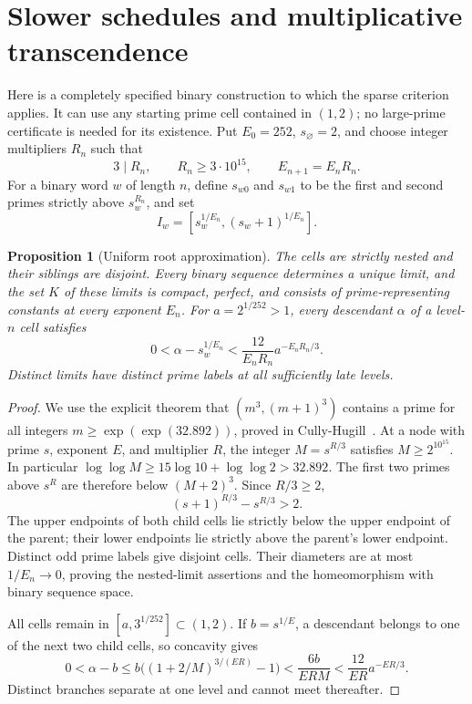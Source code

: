 \documentclass[11pt,a4paper]{article}
\newtheorem{proposition}[theorem]{Proposition}
\theoremstyle{definition}
\theoremstyle{remark}
\numberwithin{equation}{section}
\begin{document}
\section{Slower schedules and multiplicative transcendence}
\label{fol:sec:slower-schedules}

Here is a completely specified binary construction to which the sparse
criterion applies. It can use any starting prime cell contained in
$(1,2)$; no large-prime certificate is needed for its existence.
Put $E_0=252$, $s_{\varnothing}=2$, and choose integer multipliers $R_n$
such that
\begin{equation}\label{fol:eq:explicit-R-range}
 3\mid R_n,\qquad R_n\ge3\cdot10^{15},\qquad E_{n+1}=E_nR_n.
\end{equation}
For a binary word $w$ of length $n$, define $s_{w0}$ and $s_{w1}$ to
be the first and second primes strictly above $s_w^{R_n}$, and set
\[
 I_w=[s_w^{1/E_n},(s_w+1)^{1/E_n}].
\]

\begin{proposition}[Uniform root approximation]
\label{fol:prop:slow-tree}
The cells are strictly nested and their siblings are disjoint. Every
binary sequence determines a unique limit, and the set $K$ of these
limits is compact, perfect, and consists of prime-representing constants
at every exponent $E_n$. For
$a=2^{1/252}>1$, every descendant $\alpha$ of a level-$n$ cell satisfies
\begin{equation}\label{fol:eq:slow-error}
 0<\alpha-s_w^{1/E_n}
 <\frac{12}{E_nR_n}a^{-E_nR_n/3}.
\end{equation}
Distinct limits have distinct prime labels at all sufficiently late
levels.
\end{proposition}

\begin{proof}
We use the explicit theorem that $(m^3,(m+1)^3)$ contains a prime for
all integers $m\ge\exp(\exp(32.892))$, proved in
Cully-Hugill~\cite[Section~4]{CullyHugill2023}. At a node with prime
$s$, exponent $E$, and multiplier $R$, the integer $M=s^{R/3}$ satisfies
$M\ge2^{10^{15}}$. In particular
$\log\log M\ge15\log10+\log\log2>32.892$.
The first two primes above $s^R$ are therefore below $(M+2)^3$.
Since $R/3\ge2$,
\[
 (s+1)^{R/3}-s^{R/3}>2.
\]
The upper endpoints of both child cells lie strictly below the upper
endpoint of the parent; their lower endpoints lie strictly above the
parent's lower endpoint. Distinct odd prime labels give disjoint cells.
Their diameters are at most $1/E_n\to0$, proving the nested-limit
assertions and the homeomorphism with binary sequence space.

All cells remain in $[a,3^{1/252}]\subset(1,2)$. If $b=s^{1/E}$, a
descendant belongs to one of the next two child cells, so concavity gives
\[
 0<\alpha-b
 \le b\bigl((1+2/M)^{3/(ER)}-1\bigr)
 <\frac{6b}{ER M}
 <\frac{12}{ER}a^{-ER/3}.
\]
Distinct branches separate at one level and cannot meet thereafter.
\end{proof}
\end{document}
